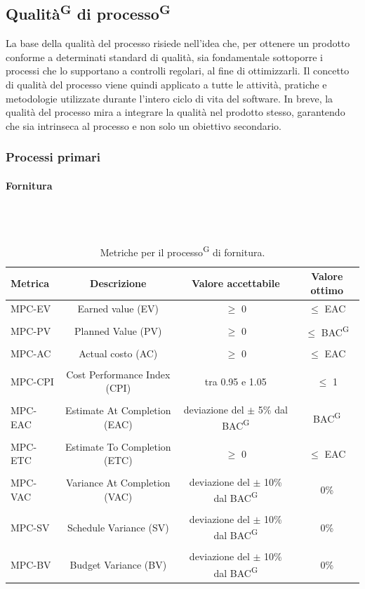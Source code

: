 \documentclass[8pt]{article}
\newcommand{\glossterm}[1]{#1\textsuperscript{G}} %
\newcommand{\subsubsubsection}[1]{\paragraph{#1}\mbox{}\\\\}
\begin{document}
\subsection{\glossterm{Qualità} di \glossterm{processo}}
La base della qualità del processo risiede nell'idea che, per ottenere un prodotto conforme a determinati standard di qualità, sia fondamentale sottoporre i processi che lo supportano a controlli regolari, al fine di ottimizzarli. Il concetto di qualità del processo viene quindi applicato a tutte le attività, pratiche e metodologie utilizzate durante l'intero ciclo di vita del software. In breve, la qualità del processo mira a integrare la qualità nel prodotto stesso, garantendo che sia intrinseca al processo e non solo un obiettivo secondario.
\subsubsection{Processi primari}
\subsubsubsection{Fornitura} 
\begin{table}[h]	
	\centering
	\begin{tabular}{lccc}
		\toprule
		\textbf{Metrica}& \textbf{Descrizione} & \textbf{Valore accettabile} & \textbf{Valore ottimo} \\
		\midrule
		MPC-EV & Earned value (EV) & $\geq$ 0 & $\leq$ EAC \\\\
		MPC-PV & Planned Value (PV) & $\geq$ 0 & $\leq$ \glossterm{BAC}\\\\
		MPC-AC & Actual costo (AC) & $\geq$ 0 & $\leq$ EAC\\\\
		MPC-CPI & Cost Performance Index (CPI) & tra 0.95 e 1.05 & $\leq$ 1\\\\
		MPC-EAC & Estimate At Completion (EAC) & deviazione del $\pm$ 5\% dal \glossterm{BAC} & \glossterm{BAC}\\\\
		MPC-ETC & Estimate To Completion (ETC) & $\geq $ 0 & $\leq$ EAC\\\\
		MPC-VAC & Variance At Completion (VAC) & deviazione del $\pm$ 10\% dal \glossterm{BAC} & 0\%\\\\
		MPC-SV & Schedule Variance (SV) & deviazione del $\pm$ 10\% dal \glossterm{BAC} & 0\%\\\\
		MPC-BV & Budget Variance (BV) & deviazione del $\pm$ 10\% dal \glossterm{BAC}  & 0\%\\
		\bottomrule
	\end{tabular}
	\caption{Metriche per il \glossterm{processo} di fornitura.}
	\label{table:Tabella metriche per il processo di fornitura.}
\end{table}
\end{document}
